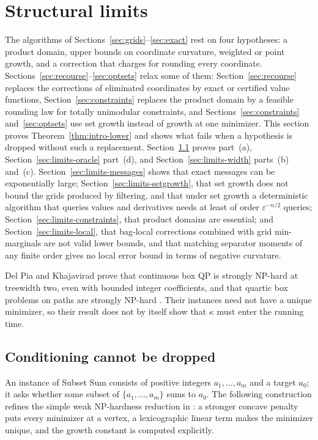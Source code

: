 \section{Structural limits}\label{sec:limits}

The algorithms of Sections~\ref{sec:grids}--\ref{sec:exact} rest on four
hypotheses: a product domain, upper bounds on coordinate curvature, weighted
or point growth, and a correction that charges for rounding every coordinate.
Sections~\ref{sec:recourse}--\ref{sec:optsets} relax some of them:
Section~\ref{sec:recourse} replaces the corrections of eliminated coordinates
by exact or certified value functions, Section~\ref{sec:constraints} replaces
the product domain by a feasible rounding law for totally unimodular
constraints, and Sections~\ref{sec:constraints} and~\ref{sec:optsets} use set
growth instead of growth at one minimizer. This section proves
Theorem~\ref{thm:intro-lower} and shows what fails when a hypothesis is
dropped without such a replacement. Section~\ref{sec:limits-conditioning}
proves part~(a), Section~\ref{sec:limits-oracle} part~(d), and
Section~\ref{sec:limits-width} parts~(b) and~(c).
Section~\ref{sec:limits-messages} shows that exact messages can be
exponentially large; Section~\ref{sec:limits-setgrowth}, that set growth does
not bound the grids produced by filtering, and that under set growth a
deterministic algorithm that queries values and derivatives needs at least of
order $\varepsilon^{-n/2}$ queries; Section~\ref{sec:limits-constraints}, that
product domains are essential; and Section~\ref{sec:limits-local}, that
bag-local corrections combined with grid min-marginals are not valid lower
bounds, and that matching separator moments of any finite order gives no
local error bound in terms of negative curvature.

Del Pia and Khajavirad prove that continuous box QP is strongly NP-hard at
treewidth two, even with bounded integer coefficients, and that quartic box
problems on paths are strongly NP-hard \cite{DelPiaKhajavirad2026}. Their
instances need not have a unique minimizer, so their result does not by
itself show that $\kappa$ must enter the running time.

\subsection{Conditioning cannot be dropped}\label{sec:limits-conditioning}

An instance of Subset Sum consists of positive integers $a_1,\ldots,a_m$ and
a target $a_0$; it asks whether some subset of $\{a_1,\ldots,a_m\}$ sums to
$a_0$. The following construction refines the simple weak NP-hardness
reduction in \cite[Remark~2]{DelPiaKhajavirad2026}: a stronger concave penalty
puts every minimizer at a vertex, a lexicographic linear term makes the
minimizer unique, and the growth constant is computed explicitly.

